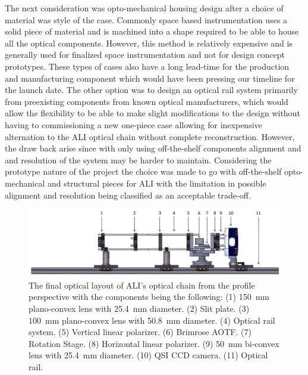 The next consideration was opto-mechanical housing design after a choice of material was style of the case. Commonly space based instrumentation uses a solid piece of material and is machined into a shape required to be able to house all the optical components. However, this method is relatively expensive and is generally used for finalized space instrumentation and not for design concept prototypes. These types of cases also have a long lead-time for the production and manufacturing component which would have been pressing our timeline for the launch date. The other option was to design an optical rail system primarily from preexisting components from known optical manufacturers, which would allow the flexibility to be able to make slight modifications to the design without having to commissioning a new one-piece case allowing for inexpensive alternation to the ALI optical chain without complete reconstruction. However, the draw back arise since with only using off-the-shelf components alignment and and resolution of the system may be harder to maintain. Considering the prototype nature of the project the choice was made to go with off-the-shelf opto-mechanical and structural pieces for ALI with the limitation in possible alignment and resolution being classified as an acceptable trade-off.

\begin{figure}[h!]
    \begin{center}
    \includegraphics[width=1.0\textwidth]{./Images/3-2-OptoMechanicalSolidWorksLayoutProfile.pdf}
    \caption[ALI's Opto-mechanical Layout]{The final optical layout of ALI's optical chain from the profile perspective with the components being the following: (1) 150~mm plano-convex lens with 25.4~mm diameter. (2) Slit plate. (3) 100~mm plano-convex lens with 50.8~mm diameter. (4) Optical rail system. (5) Vertical linear polarizer. (6) Brimrose AOTF. (7) Rotation Stage. (8) Horizontal linear polarizer. (9) 50~mm bi-convex lens with 25.4~mm diameter. (10) QSI CCD camera. (11) Optical rail.}
   \label{fig:3.2:optoMechanicDesign}
    \end{center}
\end{figure}

